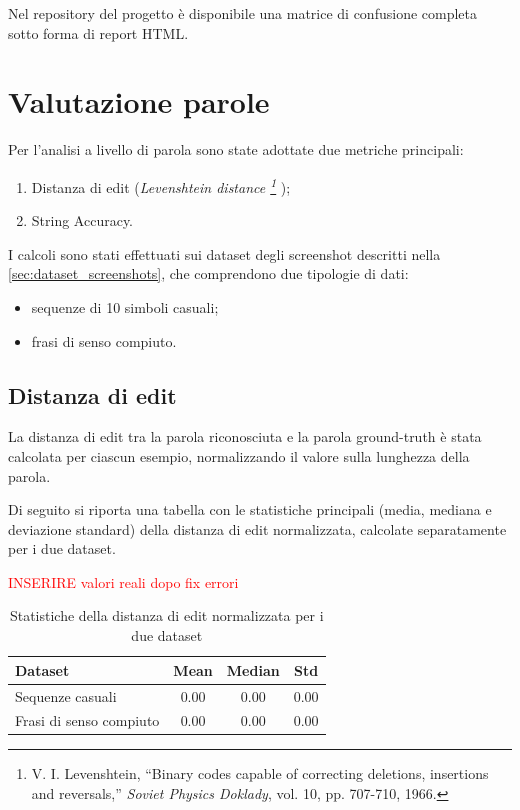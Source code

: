 Nel repository del progetto è disponibile una matrice di confusione completa sotto forma di report HTML.

\section{Valutazione parole}
\label{sec:valutazione-parole}

Per l'analisi a livello di parola sono state adottate due metriche principali:
\begin{enumerate}
    \item Distanza di edit (\emph{Levenshtein distance \footnote{V. I. Levenshtein, “Binary codes capable of correcting deletions, insertions and reversals,” \textit{Soviet Physics Doklady}, vol. 10, pp. 707-710, 1966.} });
    \item String Accuracy.
\end{enumerate}

I calcoli sono stati effettuati sui dataset degli screenshot descritti nella \autoref{sec:dataset_screenshots}, che comprendono due tipologie di dati:
\begin{itemize}
    \item sequenze di 10 simboli casuali;
    \item frasi di senso compiuto.
\end{itemize}

\subsection{Distanza di edit}

La distanza di edit tra la parola riconosciuta e la parola ground-truth è stata calcolata per ciascun esempio, normalizzando il valore sulla lunghezza della parola.

Di seguito si riporta una tabella con le statistiche principali (media, mediana e deviazione standard) della distanza di edit normalizzata, calcolate separatamente per i due dataset.

\textcolor{red}{INSERIRE valori reali dopo fix errori}

\begin{table}[htbp]
    \centering
    \begin{tabular}{lccc}
        \toprule
        Dataset & Mean & Median & Std \\
        \midrule
        Sequenze casuali & 0.00 & 0.00 & 0.00 \\
        Frasi di senso compiuto & 0.00 & 0.00 & 0.00 \\
        \bottomrule
    \end{tabular}
    \caption{Statistiche della distanza di edit normalizzata per i due dataset}
    \label{tab:edit_distance_stats}
\end{table}


